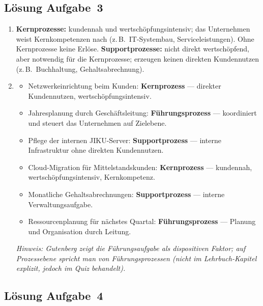 \documentclass[11pt, a4paper]{article}
\begin{document}
\subsection*{Lösung Aufgabe~3}

\begin{enumerate}[label=(\alph*)]
  \item \textbf{Kernprozesse:} kundennah und wertschöpfungsintensiv; das Unternehmen weist
  Kernkompetenzen nach (z.\,B.\ IT-Systembau, Serviceleistungen). Ohne Kernprozesse keine
  Erlöse. \textbf{Supportprozesse:} nicht direkt wertschöpfend, aber notwendig für die
  Kernprozesse; erzeugen keinen direkten Kundennutzen (z.\,B.\ Buchhaltung, Gehaltsabrechnung).

  \item
  \begin{itemize}
    \item Netzwerkeinrichtung beim Kunden: \textbf{Kernprozess} --- direkter Kundennutzen, wertschöpfungsintensiv.
    \item Jahresplanung durch Geschäftsleitung: \textbf{Führungsprozess} --- koordiniert und steuert das Unternehmen auf Zielebene.
    \item Pflege der internen JIKU-Server: \textbf{Supportprozess} --- interne Infrastruktur ohne direkten Kundennutzen.
    \item Cloud-Migration für Mittelstandskunden: \textbf{Kernprozess} --- kundennah, wertschöpfungsintensiv, Kernkompetenz.
    \item Monatliche Gehaltsabrechnungen: \textbf{Supportprozess} --- interne Verwaltungsaufgabe.
    \item Ressourcenplanung für nächstes Quartal: \textbf{Führungsprozess} --- Planung und Organisation durch Leitung.
  \end{itemize}
  \textit{Hinweis: Gutenberg zeigt die Führungsaufgabe als dispositiven Faktor; auf Prozessebene
  spricht man von Führungsprozessen (nicht im Lehrbuch-Kapitel explizit, jedoch im Quiz behandelt).}
\end{enumerate}

\subsection*{Lösung Aufgabe~4}
\end{document}
